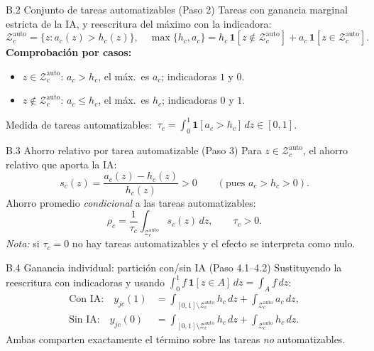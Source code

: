 \documentclass[10pt,aspectratio=169]{beamer}
\begin{document}
\begin{frame}{B.2 Conjunto de tareas automatizables (Paso 2)}
\small
Tareas con ganancia marginal estricta de la IA, y reescritura del máximo con la indicadora:
\[
\mathcal{Z}^{\mathrm{auto}}_c=\{z:a_c(z)>h_c(z)\},
\quad
\max\{h_c,a_c\}=h_c\,\mathbf{1}[z\notin\mathcal{Z}^{\mathrm{auto}}_c]+a_c\,\mathbf{1}[z\in\mathcal{Z}^{\mathrm{auto}}_c].
\]
\textbf{Comprobación por casos:}
\begin{itemize}\small
  \item $z\in\mathcal{Z}^{\mathrm{auto}}_c$: $a_c>h_c$, el máx.\ es $a_c$; indicadoras $1$ y $0$. \checkmark
  \item $z\notin\mathcal{Z}^{\mathrm{auto}}_c$: $a_c\le h_c$, el máx.\ es $h_c$; indicadoras $0$ y $1$. \checkmark
\end{itemize}
Medida de tareas automatizables: $\ \tau_c=\int_0^1\mathbf{1}[a_c>h_c]\,dz\in[0,1]$.
\end{frame}

\begin{frame}{B.3 Ahorro relativo por tarea automatizable (Paso 3)}
\small
Para $z\in\mathcal{Z}^{\mathrm{auto}}_c$, el ahorro relativo que aporta la IA:
\[
s_c(z)=\frac{a_c(z)-h_c(z)}{h_c(z)}>0
\qquad(\text{pues } a_c>h_c>0).
\]
Ahorro promedio \emph{condicional} a las tareas automatizables:
\[
\rho_c=\frac{1}{\tau_c}\int_{\mathcal{Z}^{\mathrm{auto}}_c}s_c(z)\,dz,\qquad \tau_c>0.
\]
\medskip
{\footnotesize\textit{Nota:} si $\tau_c=0$ no hay tareas automatizables y el efecto se interpreta como nulo.}
\end{frame}

\begin{frame}{B.4 Ganancia individual: partición con/sin IA (Paso 4.1--4.2)}
\small
Sustituyendo la reescritura con indicadoras y usando $\int_0^1 f\,\mathbf{1}[z\in A]\,dz=\int_A f\,dz$:
\begin{align*}
\text{Con IA:}\quad y_{jc}(1)&=\int_{[0,1]\setminus\mathcal{Z}^{\mathrm{auto}}_c}\!h_c\,dz+\int_{\mathcal{Z}^{\mathrm{auto}}_c}\!a_c\,dz, \\[2pt]
\text{Sin IA:}\quad y_{jc}(0)&=\int_{[0,1]\setminus\mathcal{Z}^{\mathrm{auto}}_c}\!h_c\,dz+\int_{\mathcal{Z}^{\mathrm{auto}}_c}\!h_c\,dz.
\end{align*}
Ambas comparten exactamente el término sobre las tareas \emph{no} automatizables.
\end{frame}
\end{document}
